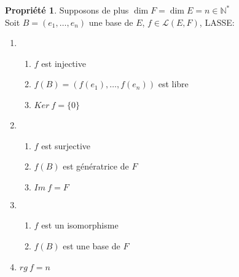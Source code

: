 \documentclass[fleqn]{article}
\theoremstyle{definition} \newtheorem*{defi}{D\'efinition}
\theoremstyle{definition} \newtheorem*{theo}{Th\'eor\`eme}
\theoremstyle{definition} \newtheorem*{coro}{Corollaire}
\theoremstyle{definition} \newtheorem*{nota}{Notation}
\theoremstyle{remark} \newtheorem*{rqs}{Remarques}
\theoremstyle{definition} \newtheorem*{prop}{Propri\'et\'e}
\begin{document}
\begin{prop} Supposons de plus $\dim F = \dim E = n\in \mathbb{N}^*$\\
	Soit $B = (e_1, \hdots, e_n)$ une base de $E$, $f \in \mathscr{L}(E,F)$, LASSE:
	\begin{enumerate}
		\item \begin{enumerate}
			\item $f$ est injective
			\item $f(B) = (f(e_1), \hdots, f(e_n))$ est libre
			\item $Ker\ f = \{0\}$
		\end{enumerate}
		\item \begin{enumerate}
			\item $f$ est surjective
			\item $f(B)$ est g\'en\'eratrice de $F$
			\item $Im\ f = F$
		\end{enumerate}
		\item \begin{enumerate}
			\item $f$ est un isomorphisme
			\item $f(B)$ est une base de $F$
		\end{enumerate}
		\item $rg\ f = n$
	\end{enumerate}
\end{prop}
\end{document}
